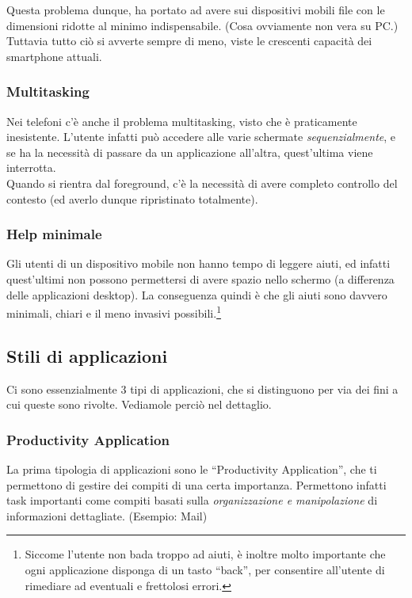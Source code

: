 \documentclass[oneside]{book}
\begin{document}
				Questa problema dunque, ha portato ad avere sui dispositivi mobili file con le dimensioni ridotte al minimo indispensabile. (Cosa ovviamente non vera su PC.) Tuttavia tutto ciò si avverte sempre di meno, viste le crescenti capacità dei smartphone attuali.

			\subsubsection{Multitasking}
				Nei telefoni c'è anche il problema multitasking, visto che è praticamente inesistente. L'utente infatti può accedere alle varie schermate \emph{sequenzialmente}, e se ha la necessità di passare da un applicazione all'altra, quest'ultima viene interrotta.\\
				Quando si rientra dal foreground, c'è la necessità di avere completo controllo del contesto (ed averlo dunque ripristinato totalmente).

			\subsubsection{Help minimale}
				Gli utenti di un dispositivo mobile non hanno tempo di leggere aiuti, ed infatti quest'ultimi non possono permettersi di avere spazio nello schermo (a differenza delle applicazioni desktop). La conseguenza quindi è che gli aiuti sono davvero minimali, chiari e il meno invasivi possibili.\footnote{Siccome l'utente non bada troppo ad aiuti, è inoltre molto importante che ogni applicazione disponga di un tasto ``back'', per consentire all'utente di rimediare ad eventuali e frettolosi errori.}

		\newpage
		\subsection{Stili di applicazioni}
			Ci sono essenzialmente 3 tipi di applicazioni, che si distinguono per via dei fini a cui queste sono rivolte. Vediamole perciò nel dettaglio.
			\subsubsection{Productivity Application}
				La prima tipologia di applicazioni sono le ``Productivity Application'', che ti permettono di gestire dei compiti di una certa importanza. Permettono infatti task importanti come compiti basati sulla \emph{organizzazione e manipolazione} di informazioni dettagliate. (Esempio: Mail) \\
\end{document}
